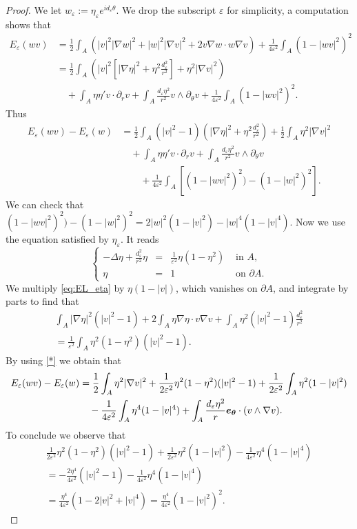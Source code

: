 \documentclass[12pt,reqno]{amsart}
\def\e {{\varepsilon}}
\renewcommand{\vec}[1]{\text{\boldmath $#1$}}
\def \p {\partial}
\numberwithin{equation}{section}
\begin{document}
\begin{proof}
We let \(w_\e:=\eta_\e e^{id_\e \theta}\). We drop the subscript \(\e\) for simplicity, a computation shows that
\begin{align*}
E_\e(w v)&=\frac12 \int_A \left(|v|^2 |\nabla w|^2 + |w|^2 |\nabla v|^2 +2v\nabla w\cdot w \nabla v\right) +\frac{1}{4\e^2}\int_A (1-|w v|^2)^2 \\
&= \frac12 \int_A \left( |v|^2 \left[|\nabla \eta|^2+\eta^2 \frac{d_\e^2}{r^2}\right]+\eta^2|\nabla v|^2\right)\\
& \quad + \int_A \eta \eta' v\cdot \p_rv + \int_A \frac{d_\e \eta^2}{r^2} v\wedge \p_\theta v +\frac{1}{4\e^2}\int_A (1-|wv|^2)^2.
\end{align*}
Thus
\begin{align*}
E_\e(wv)-E_\e(w) &=\frac12 \int_A (|v|^2-1) (|\nabla \eta|^2+\eta^2 \frac{d_\e^2}{r^2})+\frac12 \int_A \eta^2|\nabla v|^2 \\
& \quad +\int_A \eta \eta' v\cdot \p_rv+\int_A \frac{d_\e \eta^2}{r^2} v\wedge \p_\theta v \\
& \quad \quad +\frac{1}{4\e^2}\int_A [(1-|wv|^2)^2)-(1-|w|^2)^2].
\end{align*}
We can check that \((1-|wv|^2)^2)-(1-|w|^2)^2=2|w|^2(1-|v|^2)-|w|^4(1-|v|^4)\).
Now we use the equation satisfied by \(\eta_\e\). It reads
\begin{equation}\label{eq:EL_eta}
\left\{
\begin{array}{rcll}
-\Delta \eta +\frac{d_\e^2  }{r^2}\eta &=& \frac{1}{\e^2}\eta(1-\eta^2) &\text{ in } A, \\
\eta&=&1 & \text{ on } \p A.
\end{array}
\right.
\end{equation}
We multiply \eqref{eq:EL_eta} by \(\eta (1-|v|)\), which  vanishes on \(\p A\), and integrate by parts to find that
\begin{multline}\label{*}
\int_A |\nabla \eta|^2(|v|^2-1)+2\int_A \eta \nabla \eta \cdot v \nabla v+\int_A \eta^2 (|v|^2-1)\frac{d_\e^2}{r^2} \\
= \frac{1}{\e^2}\int_A \eta^2(1-\eta^2)(|v|^2-1).
\end{multline}
By using \eqref{*} we obtain that 
\begin{align*}
E_\e(wv)-E_\e(w)&= \frac12 \int_A \eta^2|\nabla v|^2+\frac{1}{2\e^2}\eta^2(1-\eta^2)(|v|^2-1)+\frac{1}{2\e^2}\int_A \eta^2(1-|v|^2) \\
& \quad -\frac{1}{4\e^2}\int_A \eta^4 (1-|v|^4)+\int_A \frac{d_\e \eta^2}{r}\vec{e_\theta}\cdot (v\wedge \nabla v).
\end{align*}
To conclude we observe that 
\begin{align*}
\frac{1}{2\e^2}\eta^2(1-\eta^2)(|v|^2-1)+\frac{1}{2\e^2}\eta^2(1-|v|^2)-\frac{1}{4\e^2} \eta^4 (1-|v|^4) \\
= -\frac{2\eta^4}{4\e^2}(|v|^2-1)-\frac{1}{4\e^2}\eta^4 (1-|v|^4) \\
=\frac{\eta^4}{4\e^2}(1-2|v|^2+|v|^4)=\frac{\eta^4}{4\e^2}(1-|v|^2)^2.
\end{align*}
\end{proof}
\end{document}
